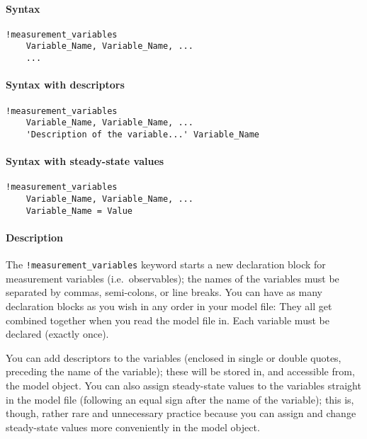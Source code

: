 


	\paragraph{Syntax}

\begin{verbatim}
!measurement_variables
    Variable_Name, Variable_Name, ...
    ...
\end{verbatim}

\paragraph{Syntax with descriptors}

\begin{verbatim}
!measurement_variables
    Variable_Name, Variable_Name, ...
    'Description of the variable...' Variable_Name
\end{verbatim}

\paragraph{Syntax with steady-state
values}

\begin{verbatim}
!measurement_variables
    Variable_Name, Variable_Name, ...
    Variable_Name = Value
\end{verbatim}

\paragraph{Description}

The \texttt{!measurement\_variables} keyword starts a new declaration
block for measurement variables (i.e.~observables); the names of the
variables must be separated by commas, semi-colons, or line breaks. You
can have as many declaration blocks as you wish in any order in your
model file: They all get combined together when you read the model file
in. Each variable must be declared (exactly once).

You can add descriptors to the variables (enclosed in single or double
quotes, preceding the name of the variable); these will be stored in,
and accessible from, the model object. You can also assign steady-state
values to the variables straight in the model file (following an equal
sign after the name of the variable); this is, though, rather rare and
unnecessary practice because you can assign and change steady-state
values more conveniently in the model object.

